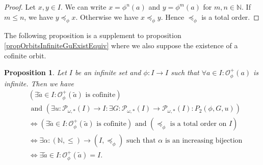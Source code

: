 \documentclass[a4paper,11pt]{article}
\theoremstyle{plain}
\newtheorem{proposition}{Proposition}[section]
\theoremstyle{definition}
\theoremstyle{remark}
\begin{document}
\begin{proof}
Let $x,y \in I$. We can write $x = \phi^n(a)$ and $y = \phi^m(a)$ for $m,n \in \mathbb{N}$. If $m \leq n$, we have $y \preceq_\phi x$. Otherwise we have $x \preceq_\phi y$. Hence $\preceq_\phi$ is a total order.
\end{proof}

The following proposition is a supplement to proposition \ref{propOrbitsInfiniteGuExistEquiv} where we also suppose the existence of a cofinite orbit.

\begin{proposition}
\label{propTripleCharacOrbPhiI}
Let $I$ be an infinite set and $\phi : I \to I$ such that $\forall a \in I : \mathcal{O}^{+}_\phi(a)$ is infinite. Then we have
\begin{align*}
&( \exists \widetilde{a} \in I : \mathcal{O}^{+}_\phi(\widetilde{a}) \text{ is cofinite} ) \\
& \text{ and } \left( \exists u : \mathcal{P}_{\omega,*}(I) \to I : \exists G : \mathcal{P}_{\omega,*}(I) \to \mathcal{P}_{\omega,*}(I) : P_2(\phi,G,u) \right) \\
& \Leftrightarrow \left( \exists \widetilde{a} \in I : \mathcal{O}^{+}_\phi(\widetilde{a}) \text{ is cofinite} \right) \text{ and } \left( \preceq_\phi \text{ is a total order on } I \right) \\
& \Leftrightarrow \exists \alpha : (\mathbb{N},\leq) \to (I,\preceq_\phi) \text{ such that } \alpha \text{ is an increasing bijection} \\
& \Leftrightarrow \exists \widetilde{a} \in I : \mathcal{O}^{+}_\phi(\widetilde{a}) = I.
\end{align*}
\end{proposition}
\end{document}
